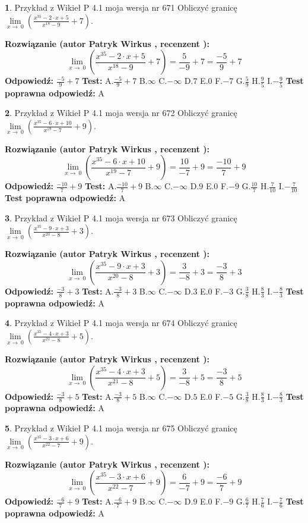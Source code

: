 \documentclass[12pt, a4paper]{article}
\theoremstyle{definition} %
\newtheorem{zad}{}
\newcommand{\zadStart}[1]{\begin{zad}#1\newline}
\newcommand{\zadStop}{\end{zad}}
\newcommand{\rozwStart}[2]{\noindent \textbf{Rozwiązanie (autor #1 , recenzent #2): }\newline}
\newcommand{\rozwStop}{\newline}
\newcommand{\odpStart}{\noindent \textbf{Odpowiedź:}\newline}
\newcommand{\odpStop}{\newline}
\newcommand{\testStart}{\noindent \textbf{Test:}\newline}
\newcommand{\testStop}{\newline}
\newcommand{\kluczStart}{\noindent \textbf{Test poprawna odpowiedź:}\newline}
\newcommand{\kluczStop}{\newline}
\begin{document}
\zadStart{Przykład z Wikieł P 4.1 moja wersja nr 671}
Obliczyć granicę $\lim\limits_{x\to\ 0}(\frac{x^{35}-2 \cdot x +5}{x^{18}-9}+7)$.
\zadStop
\rozwStart{Patryk Wirkus}{}
$$\lim\limits_{x\to\ 0}(\frac{x^{35}-2 \cdot x +5}{x^{18}-9}+7)=\frac{5}{-9}+7=\frac{-5}{9}+7$$
\rozwStop
\odpStart
$\frac{-5}{9}+7$
\odpStop
\testStart
A.$\frac{-5}{9}+7$
B.$\infty$
C.$-\infty$
D.$7$
E.$0$
F.$-7$
G.$\frac{5}{9}$
H.$\frac{9}{5}$
I.$-\frac{9}{5}$
\testStop
\kluczStart
A
\kluczStop



\zadStart{Przykład z Wikieł P 4.1 moja wersja nr 672}
Obliczyć granicę $\lim\limits_{x\to\ 0}(\frac{x^{35}-6 \cdot x +10}{x^{19}-7}+9)$.
\zadStop
\rozwStart{Patryk Wirkus}{}
$$\lim\limits_{x\to\ 0}(\frac{x^{35}-6 \cdot x +10}{x^{19}-7}+9)=\frac{10}{-7}+9=\frac{-10}{7}+9$$
\rozwStop
\odpStart
$\frac{-10}{7}+9$
\odpStop
\testStart
A.$\frac{-10}{7}+9$
B.$\infty$
C.$-\infty$
D.$9$
E.$0$
F.$-9$
G.$\frac{10}{7}$
H.$\frac{7}{10}$
I.$-\frac{7}{10}$
\testStop
\kluczStart
A
\kluczStop



\zadStart{Przykład z Wikieł P 4.1 moja wersja nr 673}
Obliczyć granicę $\lim\limits_{x\to\ 0}(\frac{x^{35}-9 \cdot x +3}{x^{20}-8}+3)$.
\zadStop
\rozwStart{Patryk Wirkus}{}
$$\lim\limits_{x\to\ 0}(\frac{x^{35}-9 \cdot x +3}{x^{20}-8}+3)=\frac{3}{-8}+3=\frac{-3}{8}+3$$
\rozwStop
\odpStart
$\frac{-3}{8}+3$
\odpStop
\testStart
A.$\frac{-3}{8}+3$
B.$\infty$
C.$-\infty$
D.$3$
E.$0$
F.$-3$
G.$\frac{3}{8}$
H.$\frac{8}{3}$
I.$-\frac{8}{3}$
\testStop
\kluczStart
A
\kluczStop



\zadStart{Przykład z Wikieł P 4.1 moja wersja nr 674}
Obliczyć granicę $\lim\limits_{x\to\ 0}(\frac{x^{35}-4 \cdot x +3}{x^{21}-8}+5)$.
\zadStop
\rozwStart{Patryk Wirkus}{}
$$\lim\limits_{x\to\ 0}(\frac{x^{35}-4 \cdot x +3}{x^{21}-8}+5)=\frac{3}{-8}+5=\frac{-3}{8}+5$$
\rozwStop
\odpStart
$\frac{-3}{8}+5$
\odpStop
\testStart
A.$\frac{-3}{8}+5$
B.$\infty$
C.$-\infty$
D.$5$
E.$0$
F.$-5$
G.$\frac{3}{8}$
H.$\frac{8}{3}$
I.$-\frac{8}{3}$
\testStop
\kluczStart
A
\kluczStop



\zadStart{Przykład z Wikieł P 4.1 moja wersja nr 675}
Obliczyć granicę $\lim\limits_{x\to\ 0}(\frac{x^{35}-3 \cdot x +6}{x^{22}-7}+9)$.
\zadStop
\rozwStart{Patryk Wirkus}{}
$$\lim\limits_{x\to\ 0}(\frac{x^{35}-3 \cdot x +6}{x^{22}-7}+9)=\frac{6}{-7}+9=\frac{-6}{7}+9$$
\rozwStop
\odpStart
$\frac{-6}{7}+9$
\odpStop
\testStart
A.$\frac{-6}{7}+9$
B.$\infty$
C.$-\infty$
D.$9$
E.$0$
F.$-9$
G.$\frac{6}{7}$
H.$\frac{7}{6}$
I.$-\frac{7}{6}$
\testStop
\kluczStart
A
\kluczStop
\end{document}

